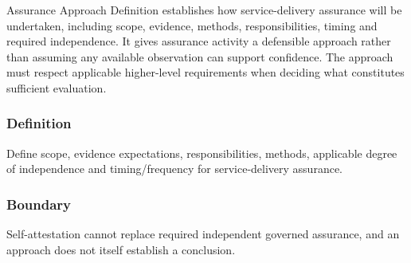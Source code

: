 Assurance Approach Definition establishes how service-delivery assurance will be undertaken, including scope, evidence, methods, responsibilities, timing and required independence. It gives assurance activity a defensible approach rather than assuming any available observation can support confidence. The approach must respect applicable higher-level requirements when deciding what constitutes sufficient evaluation.

\subsubsection*{Definition}

Define scope, evidence expectations, responsibilities, methods, applicable degree of independence and timing/\allowbreak{}frequency for service-delivery assurance.

\subsubsection*{Boundary}

Self-attestation cannot replace required independent governed assurance, and an approach does not itself establish a conclusion.

